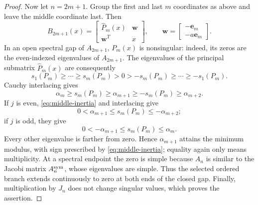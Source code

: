 \documentclass[review,hidelinks,onefignum,onetabnum]{siamart251216}
\begin{document}
\begin{proof}
Now let \(n=2m+1\).  Group the first and last \(m\) coordinates as
above and leave the middle coordinate last.  Then
\begin{equation}\label{eq:odd-dilation}
 B_{2m+1}(x)=
 \begin{bmatrix}\widehat P_m(x)&\boldsymbol w\\\boldsymbol w^T&x\end{bmatrix},
 \qquad
 \boldsymbol w=\begin{bmatrix}-\mathbf e_m\\-a\mathbf e_m\end{bmatrix}.
\end{equation}
In an open spectral gap of \(A_{2m+1}\), \(P_m(x)\) is nonsingular:
indeed, its zeros are the even-indexed eigenvalues of \(A_{2m+1}\).
The eigenvalues of the principal submatrix \(\widehat P_m(x)\) are
consequently
\[
 s_1(P_m)\geq\cdots\geq s_m(P_m)>0>
 -s_m(P_m)\geq\cdots\geq-s_1(P_m).
\]
Cauchy interlacing gives
\[
 \alpha_m\geq s_m(P_m)\geq\alpha_{m+1}
 \geq-s_m(P_m)\geq\alpha_{m+2}.
\]
If \(j\) is even, \eqref{eq:middle-inertia} and interlacing give
\[
 0<\alpha_{m+1}\leq s_m(P_m)\leq-\alpha_{m+2};
\]
if \(j\) is odd, they give
\[
 0<-\alpha_{m+1}\leq s_m(P_m)\leq\alpha_m.
\]
Every other eigenvalue is farther from zero.  Hence
\(\alpha_{m+1}\) attains the minimum modulus, with sign prescribed by
\eqref{eq:middle-inertia}; equality again only means multiplicity.  At a
spectral endpoint the zero is simple because \(A_n\) is similar to the
Jacobi matrix \(A_n^{\rm sym}\), whose eigenvalues are simple.  Thus the selected
ordered branch extends continuously to zero at both ends of the closed
gap.  Finally, multiplication by \(J_n\) does not change singular
values, which proves the assertion.
\end{proof}
\end{document}

